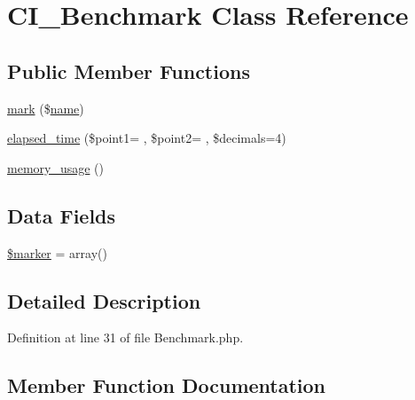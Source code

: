 \hypertarget{class_c_i___benchmark}{}\section{C\+I\+\_\+\+Benchmark Class Reference}
\label{class_c_i___benchmark}
\subsection*{Public Member Functions}
\begin{DoxyCompactItemize}
\item 
\hyperlink{class_c_i___benchmark_a18c82f5dd0118d3e7c57bcd86dc32e9e}{mark} (\$\hyperlink{user_8php_a765af5e9671743530143a6d3670fd9a6}{name})
\item 
\hyperlink{class_c_i___benchmark_a7d678e741a93eb8e3ba1aa284eaf92cc}{elapsed\+\_\+time} (\$point1= \textquotesingle{}\textquotesingle{}, \$point2= \textquotesingle{}\textquotesingle{}, \$decimals=4)
\item 
\hyperlink{class_c_i___benchmark_abdb10dca75c4c15f94796af1602d5b80}{memory\+\_\+usage} ()
\end{DoxyCompactItemize}
\subsection*{Data Fields}
\begin{DoxyCompactItemize}
\item 
\hyperlink{class_c_i___benchmark_aad34fbf53cda6bd8a3a9c46764d534fa}{\$marker} = array()
\end{DoxyCompactItemize}


\subsection{Detailed Description}


Definition at line 31 of file Benchmark.\+php.



\subsection{Member Function Documentation}
